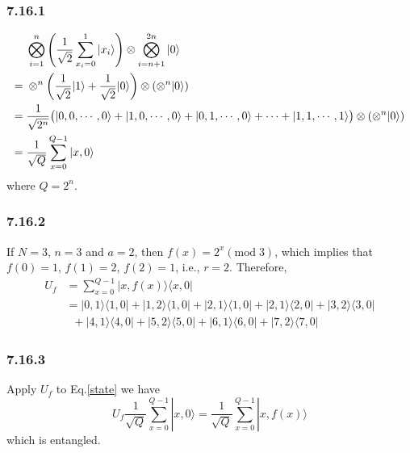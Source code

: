\documentclass[]{ctexart}
\begin{document}
\subsubsection*{7.16.1}
\begin{align}\label{state}
&\bigotimes_{i=1}^n\left(\frac{1}{\sqrt{2}}\sum_{x_i=0}^1|x_i\rangle\right)\otimes\bigotimes_{i=n+1}^{2n}|0\rangle\notag\\
={}&\otimes^n\left(\frac{1}{\sqrt{2}}|1\rangle+\frac{1}{\sqrt{2}}|0\rangle\right)\otimes(\otimes^n|0\rangle)\notag\\
={}&\frac{1}{\sqrt{2^n}}\big(|0,0,\cdots,0\rangle+|1,0,\cdots,0\rangle+|0,1,\cdots,0\rangle+\cdots+|1,1,\cdots,1\rangle\big)\otimes(\otimes^n|0\rangle)\notag\\
={}&\frac{1}{\sqrt{Q}}\sum_{x=0}^{Q-1}|x,0\rangle
\end{align}
where $Q=2^n$. 
\subsubsection*{7.16.2}
If $N=3$, $n=3$ and $a=2$, then $f(x)=2^x(\text{mod}\;3)$, which implies that $f(0)=1$, $f(1)=2$, $f(2)=1$, i.e., $r=2$. Therefore, 
\begin{align*}
U_f&=\sum_{x=0}^{Q-1}|x,f(x)\rangle\langle x,0|\\
&=|0,1\rangle\langle 1,0|+|1,2\rangle\langle 1,0|+|2,1\rangle\langle 1,0|+|2,1\rangle\langle 2,0|+|3,2\rangle\langle3,0|\\
&\;\;+|4,1\rangle\langle 4,0|+|5,2\rangle\langle 5,0|+|6,1\rangle\langle 6,0|+|7,2\rangle\langle 7,0|
\end{align*}
\subsubsection*{7.16.3}
Apply $U_f$ to Eq.\eqref{state} we have 
\begin{equation*}
U_f\frac{1}{\sqrt{Q}}\sum_{x=0}^{Q-1}|x,0\rangle=\frac{1}{\sqrt{Q}}\sum_{x=0}^{Q-1}|x,f(x)\rangle
\end{equation*}
which is entangled. 
\end{document}
